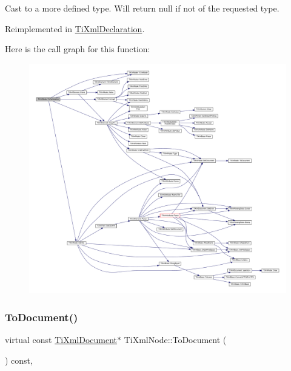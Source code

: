 Cast to a more defined type. Will return null if not of the requested type. 



Reimplemented in \hyperlink{class_ti_xml_declaration_a6bd3d1daddcaeb9543c24bfd090969ce}{Ti\+Xml\+Declaration}.

Here is the call graph for this function\+:\nopagebreak
\begin{figure}[H]
\begin{center}
\leavevmode
\includegraphics[width=350pt]{class_ti_xml_node_a4027136ca820ff4a636b607231b6a6df_cgraph}
\end{center}
\end{figure}
\mbox{\label{class_ti_xml_node_a775a904618cad6e4a8049bda4f5a6aa9}} 
\subsubsection{\texorpdfstring{To\+Document()}{ToDocument()}\hspace{0.1cm}{\footnotesize\ttfamily [1/2]}}
{\footnotesize\ttfamily virtual const \hyperlink{class_ti_xml_document}{Ti\+Xml\+Document}$\ast$ Ti\+Xml\+Node\+::\+To\+Document (\begin{DoxyParamCaption}{ }\end{DoxyParamCaption}) const\hspace{0.3cm}{\ttfamily [inline]}, {\ttfamily [virtual]}}




